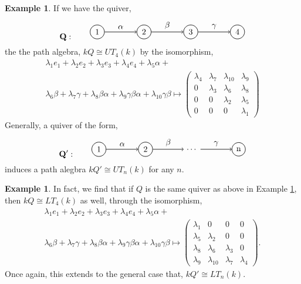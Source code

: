 \documentclass[11.5pt, twoside, a4paper, titlepage]{report}
\providecommand{\equ}[0]{\begin{equation*}}
\providecommand{\eequ}[0] {\end{equation*}}
\theoremstyle{definition}
\newtheorem{eg}[mydef]{Example}
\theoremstyle{plain}
\begin{document}
\begin{eg} \label{UTpathalgebraeg}
If we have the quiver,
\equ
\mathbf{Q}: \qquad
\begin{tikzpicture}[->,-latex, auto, every path/.style={->, semithick}, main node/.style={draw, circle}]
\node	[main node]		(1) at (0,0)		{1};
\node [main node]		(2) at (2,0)		{2};
\node [main node]		(3) at (4,0)		{3};
\node [main node]		(4) at (6,0)		{4};

\draw (1) edge node [auto] {$\alpha$} (2);
\draw (2) edge node [auto] {$\beta$} (3);
\draw (3) edge node [auto] {$\gamma$} (4);
\end{tikzpicture}
\eequ
the the path algebra, $kQ \cong UT_4(k)$ by the isomorphism,
\begin{multline*}
\lambda_1e_1+\lambda_2e_2+\lambda_3e_3+\lambda_4e_4+\lambda_5\alpha+\\
\lambda_6\beta+\lambda_7\gamma+\lambda_8\beta\alpha+\lambda_9\gamma\beta\alpha+\lambda_{10}\gamma\beta
\mapsto
\begin{pmatrix*}
\lambda_4 & \lambda_7 & \lambda_{10} & \lambda_9 \\
0 & \lambda_3 & \lambda_6 & \lambda_{8}\\
0 & 0 & \lambda_2 & \lambda_5 \\
0 & 0 & 0 & \lambda_1
\end{pmatrix*}
\end{multline*}
Generally, a quiver of the form,
\equ
\mathbf{Q'}: \qquad
\begin{tikzpicture}[->,-latex, auto, every path/.style={->, semithick}, main node/.style={draw, circle}]
\node	[main node]		(1) at (0,0)		{1};
\node [main node]		(2) at (2,0)		{2};
\node []			(3) at (4,0)		{$\dots$};
\node [main node]		(4) at (6,0)		{n};

\draw (1) edge node [auto] {$\alpha$} (2);
\draw (2) edge node [auto] {$\beta$} (3);
\draw (3) edge node [auto] {$\gamma$} (4);
\end{tikzpicture}
\eequ
induces a path alegbra $kQ' \cong UT_n(k)$ for any $n$.
\end{eg}

\begin{eg}
In fact, we find that if $Q$ is the same quiver as above in Example \ref{UTpathalgebraeg}, then $kQ \cong LT_4(k)$ as well, through the isomorphism,
\begin{multline*}
\lambda_1e_1+\lambda_2e_2+\lambda_3e_3+\lambda_4e_4+\lambda_5\alpha+\\
\lambda_6\beta+\lambda_7\gamma+\lambda_8\beta\alpha+\lambda_9\gamma\beta\alpha+\lambda_{10}\gamma\beta
\mapsto
\begin{pmatrix*}
\lambda_1 & 0 & 0 & 0\\
\lambda_5 & \lambda_2 & 0 & 0\\
\lambda_8 & \lambda_6 & \lambda_3 & 0\\
\lambda_9 & \lambda_{10} & \lambda_7 & \lambda_4
\end{pmatrix*}.
\end{multline*}
Once again, this extends to the general case that, $kQ' \cong LT_n(k)$.
\end{eg}
\end{document}
